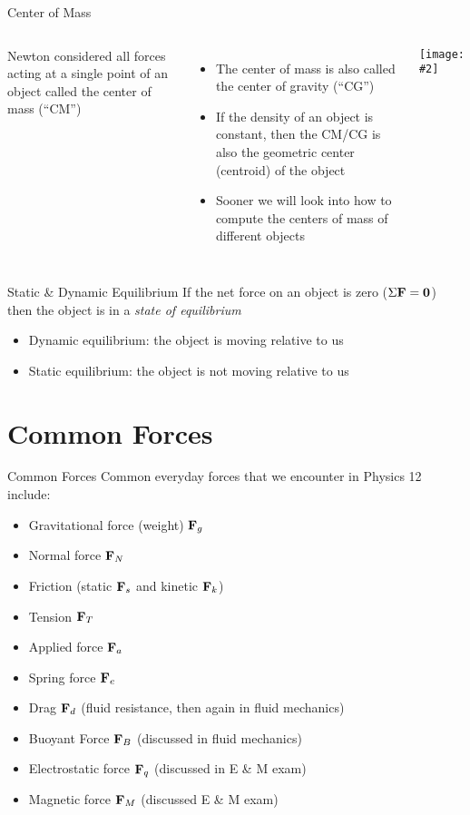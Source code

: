 \documentclass[12pt,compress,aspectratio=169]{beamer}
\newcommand{\pic}[2]{\texttt{[image: \#2]}}
\newcommand{\mb}[1]{\ensuremath\mathbf{#1}}
\begin{document}
\begin{frame}{Center of Mass}
  \begin{columns}
    Newton considered all forces acting at a single point of an object called
    the center of mass (``CM'')
    \begin{itemize}
    \item The center of mass is also called the center of gravity (``CG'')
    \item If the density of an object is constant, then the CM/CG is also the
      geometric center (centroid) of the object
    \item Sooner we will look into how to compute the centers of mass of
      different objects
    \end{itemize}

    \pic{1}{graphics/cofm.png}
  \end{columns}
\end{frame}

\begin{frame}{Static \& Dynamic Equilibrium}
  If the net force on an object is zero ($\Sigma\mb{F}=\mb{0}$) then the
  object is in a \emph{state of equilibrium}
  \begin{itemize}
  \item Dynamic equilibrium: the object is moving relative to us
  \item Static equilibrium: the object is not moving relative to us
  \end{itemize}
\end{frame}


\section{Common Forces}

\begin{frame}{Common Forces}
  Common everyday forces that we encounter in Physics 12 include:
  \begin{itemize}
  \item Gravitational force (weight) $\mb{F}_g$
  \item Normal force $\mb{F}_N$
  \item Friction (static $\mb{F}_s$ and kinetic $\mb{F}_k$)
  \item Tension $\mb{F}_T$
  \item Applied force $\mb{F}_a$
  \item Spring force $\mb{F}_e$
  \item Drag $\mb{F}_d$ (fluid resistance, then again in fluid mechanics)
  \item Buoyant Force $\mb{F}_B$ (discussed in fluid mechanics)
  \item Electrostatic force $\mb{F}_q$ (discussed in E \& M exam)
  \item Magnetic force $\mb{F}_M$ (discussed E \& M exam)
  \end{itemize}
\end{frame}
\end{document}
